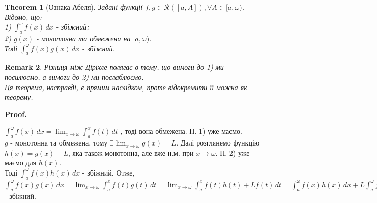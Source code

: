 \documentclass[a4paper, 10pt]{article}
\makeatletter
\def\huge{\displaystyle}
\def\qed{$\blacksquare$}
\theoremstyle{theoremdd}
\newtheorem{theorem}{Theorem}[subsection]
\theoremstyle{theoremdd}
\theoremstyle{theoremdd}
\theoremstyle{theoremdd}
\theoremstyle{theoremdd}
\theoremstyle{theoremdd}
\newtheorem{remark}[theorem]{Remark}
\theoremstyle{theoremdd}
\theoremstyle{theoremdd}
\renewenvironment{proof}[1][Proof.\\]{\par
\pushQED{\hfill \qed}%
\normalfont \topsep6\p@\@plus6\p@\relax
\trivlist
\item\relax
{\bfseries
#1\@addpunct{.}}\hspace\labelsep\ignorespaces
}{%
\popQED\endtrivlist\@endpefalse
}
\makeatother
\begin{document}
\begin{theorem}[Ознака Абеля]
Задані функції $f,g \in \mathcal{R}([a,A]), \forall A \in [a,\omega)$. Відомо, що:\\
1) $\huge\int_a^\omega f(x)\,dx$ - збіжний;\\
2) $g(x)$ - монотонна та обмежена на $[a,\omega)$.\\
Тоді $\huge\int_a^\omega f(x)g(x)\,dx$ - збіжний.
\end{theorem}

\begin{remark}
Різниця між Діріхле полягає в тому, що вимоги до 1) ми посилюємо, а вимоги до 2) ми послаблюємо.\\
Ця теорема, насправді, є прямим наслідком, проте відокремити її можна як теорему.
\end{remark}

\begin{proof}
$\huge\int_a^\omega f(x)\,dx = \huge\lim_{x \to \omega} \int_a^x f(t)\,dt$ , тоді вона обмежена. П. 1) уже маємо.\\
$g$ - монотонна та обмежена, тому $\exists \huge\lim_{x \to \omega} g(x) = L$. Далі розглянемо функцію $h(x) = g(x) - L$, яка також монотонна, але вже н.м. при $x \to \omega$. П. 2) уже маємо для $h(x)$.\\
Тоді $\huge\int_a^\omega f(x)h(x)\,dx$ - збіжний. Отже,\\
$\huge\int_a^\omega f(x)g(x)\,dx = \huge\lim_{x \to \omega} \int_a^x f(t)g(t)\,dt = \huge\lim_{x \to \omega} \int_a^x f(t)h(t)+Lf(t)\,dt = \int_a^\omega f(x)h(x)\,dx + L \int_a^\omega f(x)\,dx$ - збіжний.
\end{proof}
\end{document}

